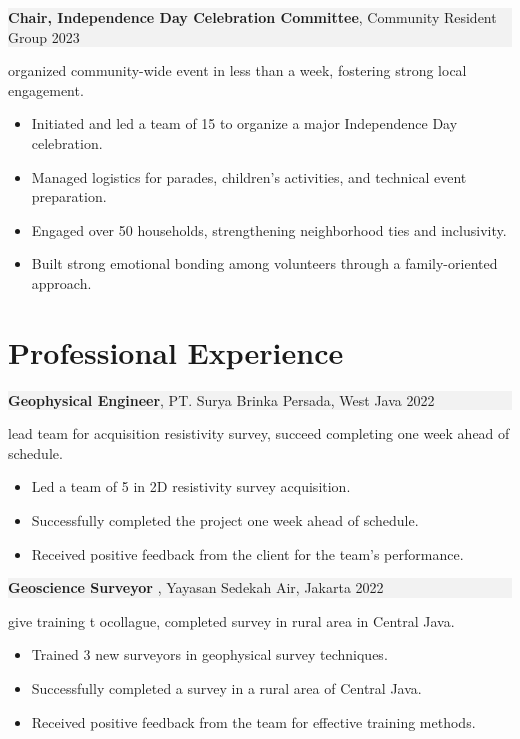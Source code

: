 \documentclass[11pt,a4paper]{article}
\begin{document}
\noindent 
\setlength{\fboxsep}{0pt}%
\colorbox[HTML]{F2F2F2}{%
  \parbox{\linewidth}{%
    \textbf{Chair, Independence Day Celebration Committee}, Community Resident Group \hfill 2023%
  }%
}
\vspace{0.3em}
organized community-wide event in less than a week, fostering strong local engagement.
\begin{itemize}[left=1.5em, noitemsep, topsep=0pt]
    \item Initiated and led a team of 15 to organize a major Independence Day celebration.
    \item Managed logistics for parades, children's activities, and technical event preparation.
    \item Engaged over 50 households, strengthening neighborhood ties and inclusivity.
    \item Built strong emotional bonding among volunteers through a family-oriented approach.
\end{itemize}

\vspace{0.3em}

\section*{Professional Experience}
\noindent
\setlength{\fboxsep}{0pt}%
\colorbox[HTML]{F2F2F2}{%
  \parbox{\linewidth}{%
    \textbf{Geophysical Engineer},  PT. Surya Brinka Persada, West Java \hfill 2022%
  }%
}
\vspace{0.3em}
lead team for acquisition resistivity survey, succeed completing one week ahead of schedule.
\begin{itemize}[left=1.5em, noitemsep, topsep=0pt]
    \item Led a team of 5 in 2D resistivity survey acquisition.
    \item Successfully completed the project one week ahead of schedule.
    \item Received positive feedback from the client for the team's performance.  
\end{itemize}

\noindent
\setlength{\fboxsep}{0pt}%
\colorbox[HTML]{F2F2F2}{%
  \parbox{\linewidth}{%
    \textbf{Geoscience Surveyor }, Yayasan Sedekah Air, Jakarta \hfill 2022%
  }%
}
\vspace{0.3em}
give training t ocollague, completed survey in rural area in Central Java.
\begin{itemize}[left=1.5em, noitemsep, topsep=0pt]
    \item Trained 3 new surveyors in geophysical survey techniques.
    \item Successfully completed a survey in a rural area of Central Java.
    \item Received positive feedback from the team for effective training methods.
\end{itemize}
\end{document}
